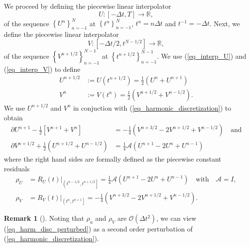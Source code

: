 \documentclass[12pt,a4paper]{article}
\numberwithin{equation}{section}
\theoremstyle{definition}
\newcommand{\qp}[1]{\left(#1\right)}
\newcommand{\qb}[1]{\left[#1\right]}
\newcommand{\bracegs}[1]{\left\lbrace#1\right\rbrace}
\newtheorem{Rem}[subsection]{Remark}
\begin{document}
   We proceed by defining  the piecewise linear interpolator 
\begin{equation}\label{eq_interp_U}
U:\qb{-\Delta t, T}\rightarrow \mathbb{R},
\end{equation}
of the sequence $\bracegs{U^n}_{n=-1}^N$ at $\bracegs{t^n}_{n=-1}^N$, $t^n=n\Delta t$ and $t^{-1} = -\Delta t$.  Next, we define the piecewise linear interpolator
\begin{equation}\label{eq_interp_V}
V:\qb{-\Delta t /2, t^{N-1/2}}\rightarrow\mathbb{R},
\end{equation}
 of the sequence $\bracegs{V^{n+1/2}}_{n=-1}^{N-1}$ at $\bracegs{t^{n+1/2}}_{n=-1}^{N-1}$.  
We use (\ref{eq_interp_U}) and (\ref{eq_interp_V}) to define
\begin{equation}
\begin{aligned}
U^{n+1/2}&:=U\qp{t^{n+1/2}}=\frac{1}{2}\qp{U^n+U^{n+1}}\\
V^{n}&:=V\qp{t^{n}}= \frac{1}{2}\qp{V^{n+1/2}+V^{n-1/2}}.
\end{aligned}
\end{equation}
We use  $U^{n+1/2}$ and $V^n$ in conjuction with  (\ref{eq_harmonic_discretization}) to obtain  
\begin{equation}\label{eq_harm_disc_perturbed}
\begin{aligned}
\partial U^{n+1}-\frac{1}{2}\qb{V^{n+1}+V^n}&= -\frac{1}{4}\left(V^{n+3/2}-2V^{n+1/2}+V^{n-1/2}\right) \quad \text{and}\\
\partial V^{n+1/2} +\frac{1}{2}\qp{U^{n+1/2}+U^{n-1/2}}&=\frac{1}{4}\mathcal{A}\left(U^{n+1}-2U^n+U^{n-1}\right)
\end{aligned}
\end{equation}
where the right hand sides are formally defined as the piecewise constant residuals
\begin{equation}
\begin{aligned}
\rho_U&=R_U\left(t\right)|_{\left(t^{n-1/2}, t^{n+1/2}\right]}=\frac{1}{4}\mathcal{A}\left(U^{n+1}-2U^n+U^{n-1}\right)\quad\text{with}\quad \mathcal{A}=I,\\
\rho_V&=R_V\left(t\right)|_{\left(t^n, t^{n+1}\right]}=-\frac{1}{4}\left(V^{n+3/2}-2V^{n+1/2}+V^{n-1/2}\right).
\end{aligned}
\end{equation}
\begin{Rem}[]\label{Rem_opt_perturbation}
Noting that $\rho_u$ and $\rho_V$ are $\mathcal{O}\qp{\Delta t^2}$,  we can view  (\ref{eq_harm_disc_perturbed}) as a second order perturbation of (\ref{eq_harmonic_discretization}).
\end{Rem}
\end{document}
